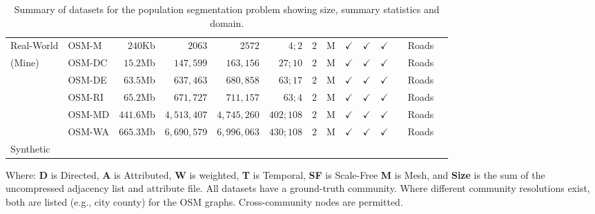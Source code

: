 \begin{landscape}
\begin{table}[t]
\begin{center}
{\begin{tabular}{ll|rrrrrlccccll}
            Real-World  & OSM-M                                       &$240$Kb &$2063$   &$2572$    & $4;2$        & $2$          & M      &  $\checkmark$ &  $\checkmark$ &$\checkmark$ &                & Roads \\
            (Mine)      & OSM-DC                                      &$15.2$Mb&$147,599$&$163,156$ & $27;10$      & $2$          & M      &  $\checkmark$ &  $\checkmark$ &$\checkmark$ &                & Roads       \\
                        & OSM-DE                                      &$63.5$Mb&$637,463$&$680,858$ & $63;17$      & $2$          & M      &  $\checkmark$ &  $\checkmark$ &$\checkmark$ &                & Roads       \\
                        & OSM-RI                                      &$65.2$Mb&$671,727$&$711,157$ & $63;4$       & $2$          & M      &  $\checkmark$ &  $\checkmark$ &$\checkmark$ &                & Roads       \\ 
                        & OSM-MD                                      &$441.6$Mb&$4,513,407$&$4,745,260$&$402;108$ & $2$          & M      &  $\checkmark$ &  $\checkmark$ &$\checkmark$ &                & Roads       \\ 
                        & OSM-WA                                      &$665.3$Mb&$6,690,579$&$6,996,063$&$430;108$ & $2$          & M      &  $\checkmark$ &  $\checkmark$ &$\checkmark$ &                & Roads       \\ 
            Synthetic   &    


            \end{tabular}
        \caption{Summary of datasets for the population segmentation problem showing size, summary statistics and domain.} 
        \label{Table:cd-datasets}
        }
        \end{center}
    \end{table}
    \noindent
    {\scriptsize
    Where:
    \textbf{D} is Directed, 
    \textbf{A} is Attributed, 
    \textbf{W} is weighted, 
    \textbf{T} is Temporal, 
    \textbf{SF} is Scale-Free 
    \textbf{M} is Mesh, and 
    \textbf{Size} is the sum of the uncompressed adjacency list and attribute file. 
    All datasets have a ground-truth community. 
    Where different community resolutions exist, both are listed (e.g., city county) for the OSM graphs.
    Cross-community nodes are permitted.  
    }
\end{landscape}